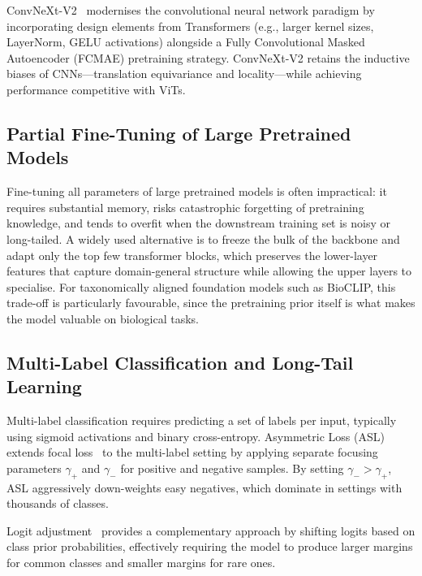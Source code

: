 ConvNeXt-V2~\cite{woo2023convnextv2} modernises the convolutional neural network paradigm by incorporating design elements from Transformers (e.g., larger kernel sizes, LayerNorm, GELU activations) alongside a Fully Convolutional Masked Autoencoder (FCMAE) pretraining strategy. ConvNeXt-V2 retains the inductive biases of CNNs---translation equivariance and locality---while achieving performance competitive with ViTs.

\subsection{Partial Fine-Tuning of Large Pretrained Models}

Fine-tuning all parameters of large pretrained models is often impractical: it requires substantial memory, risks catastrophic forgetting of pretraining knowledge, and tends to overfit when the downstream training set is noisy or long-tailed. A widely used alternative is to freeze the bulk of the backbone and adapt only the top few transformer blocks, which preserves the lower-layer features that capture domain-general structure while allowing the upper layers to specialise. For taxonomically aligned foundation models such as BioCLIP, this trade-off is particularly favourable, since the pretraining prior itself is what makes the model valuable on biological tasks.

\subsection{Multi-Label Classification and Long-Tail Learning}

Multi-label classification requires predicting a set of labels per input, typically using sigmoid activations and binary cross-entropy. Asymmetric Loss (ASL)~\cite{ridnik2021asymmetric} extends focal loss~\cite{lin2017focal} to the multi-label setting by applying separate focusing parameters $\gamma_+$ and $\gamma_-$ for positive and negative samples. By setting $\gamma_- > \gamma_+$, ASL aggressively down-weights easy negatives, which dominate in settings with thousands of classes.

Logit adjustment~\cite{menon2021longtail} provides a complementary approach by shifting logits based on class prior probabilities, effectively requiring the model to produce larger margins for common classes and smaller margins for rare ones.
